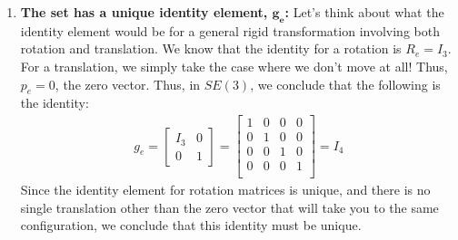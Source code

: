 \documentclass[oneside]{book}
\begin{document}
\begin{enumerate}
    \item \textbf{The set has a unique identity element, $\mathbf{g_e}$: } Let's think about what the identity element would be for a general rigid transformation involving both rotation and translation. We know that the identity for a rotation is $R_e = I_3$.\\
    For a translation, we simply take the case where we don't move at all! Thus, $p_e = 0$, the zero vector. Thus, in $SE(3)$, we conclude that the following is the identity:
    \begin{align}
        g_e = 
         \begin{bmatrix}
        I_3 & 0\\
        0 & 1
        \end{bmatrix}
        = 
        \begin{bmatrix}
        1 & 0 & 0 & 0\\
        0 & 1 & 0 & 0\\
        0 & 0 & 1 & 0\\
        0 & 0 & 0 & 1\\
        \end{bmatrix}
        = I_4
    \end{align}
    Since the identity element for rotation matrices is unique, and there is no single translation other than the zero vector that will take you to the same configuration, we conclude that this identity must be unique.
    

\end{enumerate}
\end{document}

